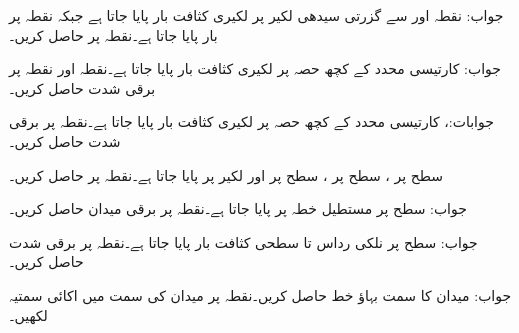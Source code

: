  

جواب:
نقطہ  اور  سے گزرتی سیدھی لکیر پر لکیری کثافت بار  پایا جاتا ہے جبکہ نقطہ  پر  بار پایا جاتا ہے۔نقطہ  پر  حاصل کریں۔

جواب:
کارتیسی  محدد کے کچھ حصہ  پر لکیری کثافت بار  پایا جاتا ہے۔نقطہ   اور نقطہ   پر برقی شدت  حاصل کریں۔

جوابات:، 
کارتیسی  محدد کے کچھ حصہ  پر لکیری کثافت بار  پایا جاتا
 ہے۔نقطہ  پر برقی شدت  حاصل کریں۔

سطح  پر ، سطح  پر ، سطح  پر  اور لکیر  پر
  پایا جاتا ہے۔نقطہ  پر  حاصل کریں۔

جواب:
سطح  پر مستطیل خطہ   پر  پایا جاتا ہے۔نقطہ  پر برقی میدان  حاصل کریں۔

جواب:
سطح  پر نلکی رداس  تا  سطحی کثافت بار  پایا جاتا ہے۔نقطہ  پر برقی شدت  حاصل کریں۔

جواب:
میدان  کا سمت بہاؤ خط حاصل کریں۔نقطہ  پر میدان کی سمت میں اکائی سمتیہ لکھیں۔

